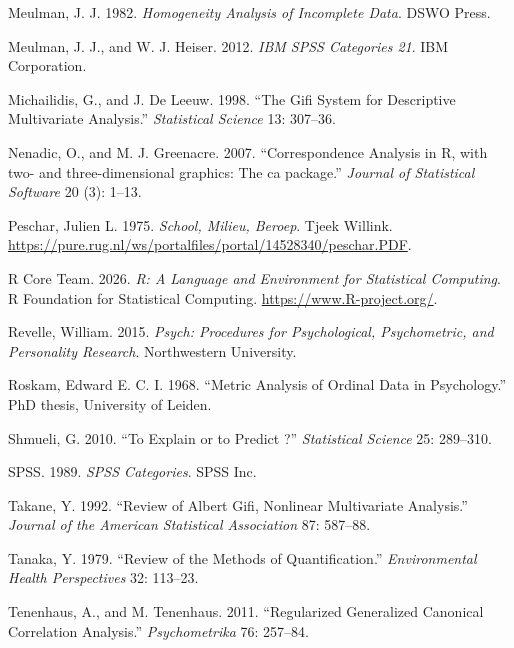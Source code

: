 \documentclass[
  12pt,
  letterpaper,
  DIV=11,
  numbers=noendperiod]{scrreprt}
\newlength{\cslhangindent}
\newenvironment{CSLReferences}[2] %
 {\begin{list}{}{%
  \setlength{\itemindent}{0pt}
  \setlength{\leftmargin}{0pt}
  \setlength{\parsep}{0pt}
  \ifodd #1
   \setlength{\leftmargin}{\cslhangindent}
   \setlength{\itemindent}{-1\cslhangindent}
  \fi
  \setlength{\itemsep}{#2\baselineskip}}}
 {\end{list}}
\begin{document}
\begin{CSLReferences}{1}{1}
Meulman, J. J. 1982. \emph{{Homogeneity Analysis of Incomplete Data}}.
{DSWO} Press.

Meulman, J. J., and W. J. Heiser. 2012. \emph{IBM SPSS Categories 21}.
IBM Corporation.

Michailidis, G., and J. De Leeuw. 1998. {``The Gifi System for
Descriptive Multivariate Analysis.''} \emph{Statistical Science} 13:
307--36.

Nenadic, O., and M. J. Greenacre. 2007. {``{Correspondence Analysis in
R, with two- and three-dimensional graphics: The ca package}.''}
\emph{Journal of Statistical Software} 20 (3): 1--13.

Peschar, Julien L. 1975. \emph{{School, Milieu, Beroep}}. Tjeek Willink.
\url{https://pure.rug.nl/ws/portalfiles/portal/14528340/peschar.PDF}.

R Core Team. 2026. \emph{R: A Language and Environment for Statistical
Computing}. R Foundation for Statistical Computing.
\url{https://www.R-project.org/}.

Revelle, William. 2015. \emph{Psych: Procedures for Psychological,
Psychometric, and Personality Research}. Northwestern University.

Roskam, Edward E. C. I. 1968. {``{Metric Analysis of Ordinal Data in
Psychology}.''} PhD thesis, University of Leiden.

Shmueli, G. 2010. {``{To Explain or to Predict ?}''} \emph{Statistical
Science} 25: 289--310.

SPSS. 1989. \emph{SPSS Categories}. SPSS Inc.

Takane, Y. 1992. {``{Review of Albert Gifi, Nonlinear Multivariate
Analysis}.''} \emph{Journal of the American Statistical Association} 87:
587--88.

Tanaka, Y. 1979. {``{Review of the Methods of Quantification}.''}
\emph{Environmental Health Perspectives} 32: 113--23.

Tenenhaus, A., and M. Tenenhaus. 2011. {``{Regularized Generalized
Canonical Correlation Analysis}.''} \emph{Psychometrika} 76: 257--84.


\end{CSLReferences}
\end{document}
